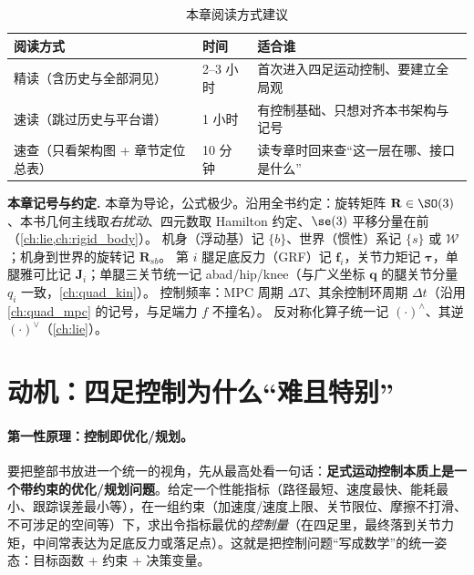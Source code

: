 \begin{table}[H]\centering\small
\caption{本章阅读方式建议}
\begin{tabular}{lll}
\toprule
阅读方式 & 时间 & 适合谁 \\
\midrule
精读（含历史与全部洞见） & 2--3 小时 & 首次进入四足运动控制、要建立全局观 \\
速读（跳过历史与平台谱） & 1 小时 & 有控制基础、只想对齐本书架构与记号 \\
速查（只看架构图 + 章节定位总表） & 10 分钟 & 读专章时回来查“这一层在哪、接口是什么” \\
\bottomrule
\end{tabular}
\end{table}

\begin{note}
\textbf{本章记号与约定.}\;
本章为导论，公式极少。沿用全书约定：旋转矩阵 $\mathbf{R}\in\SO(3)$、本书几何主线取\emph{右扰动}、四元数取 Hamilton 约定、$\se(3)$ 平移分量在前（\cref{ch:lie,ch:rigid_body}）。
机身（浮动基）记 $\{b\}$、世界（惯性）系记 $\{s\}$ 或 $\mathcal{W}$；机身到世界的旋转记 $\mathbf{R}_{sb}$。
第 $i$ 腿足底反力（GRF）记 $\mathbf{f}_i$，关节力矩记 $\boldsymbol{\tau}$，单腿雅可比记 $\mathbf{J}_i$；单腿三关节统一记 abad/hip/knee（与广义坐标 $\mathbf q$ 的腿关节分量 $q_i$ 一致，\cref{ch:quad_kin}）。
控制频率：MPC 周期 $\Delta T$、其余控制环周期 $\Delta t$（沿用 \cref{ch:quad_mpc} 的记号，与足端力 $f$ 不撞名）。
反对称化算子统一记 $(\cdot)^\wedge$、其逆 $(\cdot)^\vee$（\cref{ch:lie}）。
\end{note}

\section{动机：四足控制为什么“难且特别”}
\label{sec:qa-why-hard}

\paragraph{第一性原理：控制即优化/规划。}
要把整部书放进一个统一的视角，先从最高处看一句话：\textbf{足式运动控制本质上是一个带约束的优化/规划问题}。给定一个性能指标（路径最短、速度最快、能耗最小、跟踪误差最小等），在一组约束（加速度/速度上限、关节限位、摩擦不打滑、不可涉足的空间等）下，求出令指标最优的\emph{控制量}（在四足里，最终落到关节力矩，中间常表达为足底反力或落足点）。这就是把控制问题“写成数学”的统一姿态：目标函数 + 约束 + 决策变量\cite{yu2021quadruped}。

